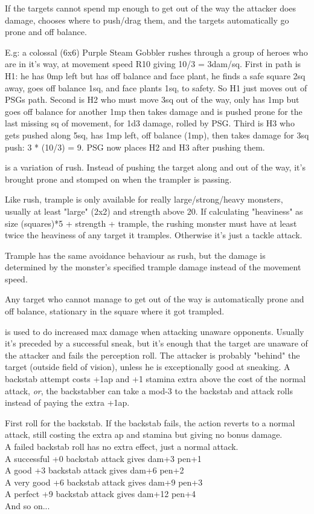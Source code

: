 If the targets cannot spend mp enough to get out of the way the attacker does damage, chooses where to push/drag them, and the targets automatically go prone and off balance.

E.g: a colossal (6x6) Purple Steam Gobbler rushes through a group of heroes who are in it's way, at movement speed R10 giving 10/3 = 3dam/sq. First in path is H1: he has 0mp left but has off balance and face plant, he finds a safe square 2sq away, goes off balance 1sq, and face plants 1sq, to safety. So H1 just moves out of PSGs path. Second is H2 who must move 3sq out of the way, only has 1mp but goes off balance for another 1mp then takes damage and is pushed prone for the last missing sq of movement, for 1d3 damage, rolled by PSG. Third is H3 who gets pushed along 5sq, has 1mp left, off balance (1mp), then takes damage for 3sq push: 3 * (10/3) = 9. PSG now places H2 and H3 after pushing them.


 is a variation of rush. Instead of pushing the target along and out of the way, it's brought prone and stomped on when the trampler is passing.

Like rush, trample is only available for really large/strong/heavy monsters, usually at least "large" (2x2) and strength above 20. If calculating "heaviness" as size (squares)*5 + strength + trample, the rushing monster must have at least twice the heaviness of any target it tramples. Otherwise it's just a tackle attack.

Trample has the same avoidance behaviour as rush, but the damage is determined by the monster's specified trample damage instead of the movement speed.

Any target who cannot manage to get out of the way is automatically prone and off balance, stationary in the square where it got trampled.


 is used to do increased max damage when attacking unaware opponents. Usually it's preceded by a successful sneak, but it's enough that the target are unaware of the attacker and fails the perception roll. The attacker is probably "behind" the target (outside field of vision), unless he is exceptionally good at sneaking. A backstab attempt costs +1ap and +1 stamina extra above the cost of the normal attack, \emph{or}, the backstabber can take a mod-3 to the backstab and attack rolls instead of paying the extra +1ap.

First roll for the backstab. If the backstab fails, the action reverts to a normal attack, still costing the extra ap and stamina but giving no bonus damage.\\
A failed backstab roll has no extra effect, just a normal attack.\\
A successful +0 backstab attack gives dam+3 pen+1 \\
A good +3 backstab attack gives dam+6 pen+2 \\
A very good +6 backstab attack gives dam+9 pen+3 \\
A perfect +9 backstab attack gives dam+12 pen+4 \\
And so on...

